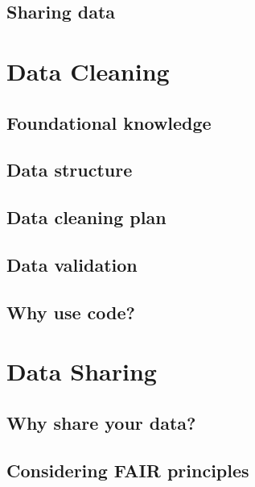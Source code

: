 \documentclass[
]{book}
\begin{document}
\hypertarget{sharing-data}{%
\section{Sharing data}\label{sharing-data}}

\hypertarget{data-cleaning}{%
\chapter{Data Cleaning}\label{data-cleaning}}

\hypertarget{foundational-knowledge}{%
\section{Foundational knowledge}\label{foundational-knowledge}}

\hypertarget{data-structure}{%
\section{Data structure}\label{data-structure}}

\hypertarget{data-cleaning-plan}{%
\section{Data cleaning plan}\label{data-cleaning-plan}}

\hypertarget{data-validation}{%
\section{Data validation}\label{data-validation}}

\hypertarget{why-use-code}{%
\section{Why use code?}\label{why-use-code}}

\hypertarget{data-sharing}{%
\chapter{Data Sharing}\label{data-sharing}}

\hypertarget{why-share-your-data}{%
\section{Why share your data?}\label{why-share-your-data}}

\hypertarget{considering-fair-principles}{%
\section{Considering FAIR principles}\label{considering-fair-principles}}
\end{document}
